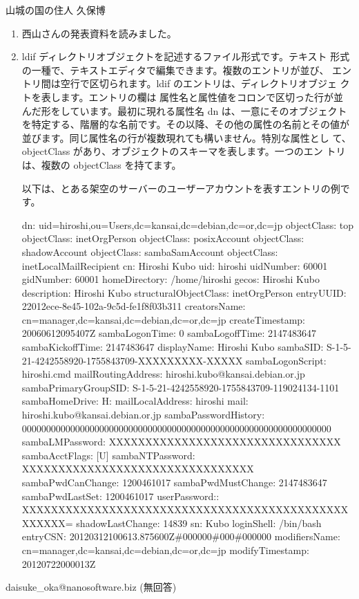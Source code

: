 \documentclass[mingoth,a4paper]{jsarticle}
\begin{document}
\begin{prework}{ 山城の国の住人 久保博 }
  \begin{enumerate}
  \item 西山さんの発表資料を読みました。
  \item ldif ディレクトリオブジェクトを記述するファイル形式です。テキスト
    形式の一種で、テキストエディタで編集できます。複数のエントリが並び、
    エントリ間は空行で区切られます。ldif のエントリは、ディレクトリオブジェ
    クトを表します。エントリの欄は 属性名と属性値をコロンで区切った行が並
    んだ形をしています。最初に現れる属性名 dn は、一意にそのオブジェクト
    を特定する、階層的な名前です。その以降、その他の属性の名前とその値が
    並びます。同じ属性名の行が複数現れても構いません。特別な属性とし
    て、objectClass があり、オブジェクトのスキーマを表します。一つのエン
    トリは、複数の objectClass を持てます。

    以下は、とある架空のサーバーのユーザーアカウントを表すエントリの例です。
    \begin{commandline}
      dn: uid=hiroshi,ou=Users,dc=kansai,dc=debian,dc=or,dc=jp
      objectClass: top
      objectClass: inetOrgPerson
      objectClass: posixAccount
      objectClass: shadowAccount
      objectClass: sambaSamAccount
      objectClass: inetLocalMailRecipient
      cn: Hiroshi Kubo
      uid: hiroshi
      uidNumber: 60001
      gidNumber: 60001
      homeDirectory: /home/hiroshi
      gecos: Hiroshi Kubo
      description: Hiroshi Kubo
      structuralObjectClass: inetOrgPerson
      entryUUID: 22012ece-8e45-102a-9c5d-fe1f8f03b311
      creatorsName: cn=manager,dc=kansai,dc=debian,dc=or,dc=jp
      createTimestamp: 20060612095407Z
      sambaLogonTime: 0
      sambaLogoffTime: 2147483647
      sambaKickoffTime: 2147483647
      displayName: Hiroshi Kubo
      sambaSID: S-1-5-21-4242558920-1755843709-XXXXXXXXX-XXXXX
      sambaLogonScript: hiroshi.cmd
      mailRoutingAddress: hiroshi.kubo@kansai.debian.or.jp
      sambaPrimaryGroupSID: S-1-5-21-4242558920-1755843709-119024134-1101
      sambaHomeDrive: H:
      mailLocalAddress: hiroshi
      mail: hiroshi.kubo@kansai.debian.or.jp
      sambaPasswordHistory: 0000000000000000000000000000000000000000000000000000000000000000
      sambaLMPassword: XXXXXXXXXXXXXXXXXXXXXXXXXXXXXXXX
      sambaAcctFlags: [U]
      sambaNTPassword: XXXXXXXXXXXXXXXXXXXXXXXXXXXXXXXX
      sambaPwdCanChange: 1200461017
      sambaPwdMustChange: 2147483647
      sambaPwdLastSet: 1200461017
      userPassword:: XXXXXXXXXXXXXXXXXXXXXXXXXXXXXXXXXXXXXXXXXXXXXXXXXXX=
      shadowLastChange: 14839
      sn: Kubo
      loginShell: /bin/bash
      entryCSN: 20120312100613.875600Z\#000000\#000\#000000
      modifiersName: cn=manager,dc=kansai,dc=debian,dc=or,dc=jp
      modifyTimestamp: 20120722000013Z
    \end{commandline}
  \end{enumerate}
\end{prework}
\begin{prework}{ daisuke\_oka@nanosoftware.biz }
(無回答)
\end{prework}
\end{document}
